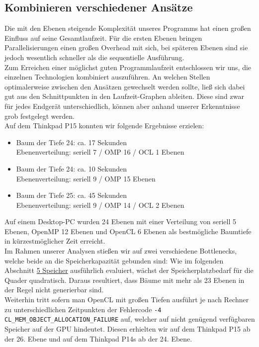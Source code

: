 \subsection{Kombinieren verschiedener Ansätze}\label{openCL-Fehler}
\vspace{-0.25cm}
Die mit den Ebenen steigende Komplexität unseres Programms hat einen großen Einfluss auf 
seine Gesamtlaufzeit. Für die ersten Ebenen bringen Parallelisierungen einen großen Overhead
mit sich, bei späteren Ebenen sind sie jedoch wesentlich schneller als die sequentielle Ausführung.\\
Zum Erreichen einer möglichst guten Programmlaufzeit entschlossen wir uns, die einzelnen 
Technologien kombiniert auszuführen. An welchen Stellen optimalerweise zwischen den Ansätzen
gewechselt werden sollte, ließ sich dabei gut aus den Schnittpunkten in den Laufzeit-Graphen ableiten. 
Diese sind zwar für jedes Endgerät unterschiedlich, können aber anhand unserer Erkenntnisse grob festgelegt werden.
\\Auf dem Thinkpad P15 konnten wir folgende Ergebnisse erzielen:
\begin{itemize}[itemsep=0pt, parsep=0pt, topsep=0pt, partopsep=0pt]
    \item Baum der Tiefe 24: ca. 17 Sekunden\\
            Ebenenverteilung: seriell 7 / OMP 16 / OCL 1 Ebenen
    \item Baum der Tiefe 24: ca. 10 Sekunden\\
            Ebenenverteilung: seriell 9 / OMP 15 Ebenen
    \item Baum der Tiefe 25: ca. 45 Sekunden\\
            Ebenenverteilung: seriell 9 / OMP 14 / OCL 2 Ebenen
\end{itemize}
Auf einem Desktop-PC wurden 24 Ebenen mit einer Verteilung von seriell 5 Ebenen, OpenMP 12 Ebenen und 
OpenCL 6 Ebenen als bestmögliche Baumtiefe in kürzestmöglicher Zeit  erreicht.
\vspace{0.25cm}\\
Im Rahmen unserer Analysen stießen wir auf zwei verschiedene Bottlenecks, welche beide an die Speicherkapazität
gebunden sind: 
Wie im folgenden Abschnitt \hyperref[Speicher]{5 Speicher} ausführlich evaluiert, wächst der Speicherplatzbedarf
für die Quader quadratisch. Daraus resultiert, dass Bäume mit mehr als 23 Ebenen in der Regel nicht generierbar sind.\\
Weiterhin tritt sofern man OpenCL mit großen Tiefen ausführt je nach Rechner zu unterschiedlichen Zeitpunkten 
der Fehlercode \texttt{-4 CL\_MEM\_OBJECT\_ALLOCATION\_FAILURE} auf, welcher auf nicht genügend verfügbaren Speicher
auf der GPU hindeutet. Diesen erhielten wir auf dem Thinkpad P15 ab der 26. Ebene und auf dem Thinkpad P14s ab der 24. Ebene. 